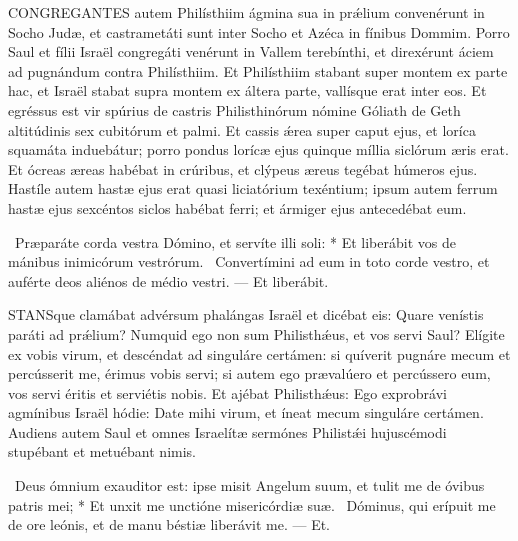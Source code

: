 




\lettrine[lines=2]{C}{ONGREGANTES} autem Philísthiim ágmina sua in prǽlium convenérunt in Socho Judæ, et castrametáti sunt inter Socho et Azéca in fínibus Dommim. Porro Saul et fílii Israël congregáti venérunt in Vallem terebínthi, et direxérunt áciem ad pugnándum contra Philísthiim. Et Philísthiim stabant super montem ex parte hac, et Israël stabat supra montem ex áltera parte, vallísque erat inter eos. Et egréssus est vir spúrius de castris Philisthinórum nómine Góliath de Geth altitúdinis sex cubitórum et palmi. Et cassis ǽrea super caput ejus, et loríca squamáta induebátur; porro pondus lorícæ ejus quinque míllia siclórum æris erat. Et ócreas æreas habébat in crúribus, et clýpeus æreus tegébat húmeros ejus. Hastíle autem hastæ ejus erat quasi liciatórium texéntium; ipsum autem ferrum hastæ ejus sexcéntos siclos habébat ferri; et ármiger ejus antecedébat eum.

\R\ Præparáte corda vestra Dómino, et servíte illi soli: * Et liberábit vos de mánibus inimicórum vestrórum. \V\ Convertímini ad eum in toto corde vestro, et auférte deos aliénos de médio vestri. --- Et liberábit.


\lettrine[lines=2]{S}{TANS}que clamábat advérsum phalángas Israël et dicébat eis: Quare venístis paráti ad prǽlium? Numquid ego non sum Philisthǽus, et vos servi Saul? Elígite ex vobis virum, et descéndat ad singuláre certámen: si quíverit pugnáre mecum et percússerit me, érimus vobis servi; si autem ego prævalúero et percússero eum, vos servi éritis et serviétis nobis. Et ajébat Philisthǽus: Ego exprobrávi agmínibus Israël hódie: Date mihi virum, et íneat mecum singuláre certámen. Audiens autem Saul et omnes Israelítæ sermónes Philistǽi hujuscémodi stupébant et metuébant nimis.

\R\ Deus ómnium exauditor est: ipse misit Angelum suum, et tulit me de óvibus patris mei; * Et unxit me unctióne misericórdiæ suæ. \V\ Dóminus, qui erípuit me de ore leónis, et de manu béstiæ liberávit me. --- Et.

